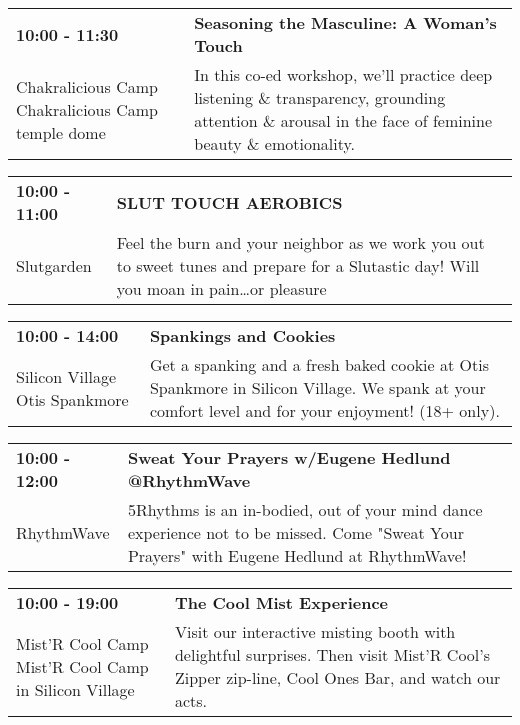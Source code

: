 \begin{tabular}{ p{1in} p{2.2in} }
    \textbf{10:00 - 11:30} & \textbf{Seasoning the Masculine: A Woman's Touch } \\
    Chakralicious Camp \newline Chakralicious Camp temple dome & In this co-ed workshop, we'll practice deep listening \& transparency, grounding attention \& arousal in the face of feminine beauty \& emotionality. \\
    \hline 
\end{tabular}
    
\begin{tabular}{ p{1in} p{2.2in} }
    \textbf{10:00 - 11:00} & \textbf{SLUT TOUCH AEROBICS} \\
    Slutgarden \newline  & Feel the burn and your neighbor as we work you out to sweet tunes and prepare for a Slutastic day! Will you moan in pain\ldots or pleasure \\
    \hline 
\end{tabular}
    
\begin{tabular}{ p{1in} p{2.2in} }
    \textbf{10:00 - 14:00} & \textbf{Spankings and Cookies} \\
    Silicon Village \newline Otis Spankmore & Get a spanking and a fresh baked cookie at Otis Spankmore in Silicon Village. We spank at your comfort level and for your enjoyment! (18+ only). \\
    \hline 
\end{tabular}
    
\begin{tabular}{ p{1in} p{2.2in} }
    \textbf{10:00 - 12:00} & \textbf{Sweat Your Prayers w/Eugene Hedlund @RhythmWave} \\
    RhythmWave \newline  & 5Rhythms is an in-bodied, out of your mind dance experience not to be missed. Come "Sweat Your Prayers" with Eugene Hedlund at RhythmWave! \\
    \hline 
\end{tabular}
    
\begin{tabular}{ p{1in} p{2.2in} }
    \textbf{10:00 - 19:00} & \textbf{The Cool Mist Experience} \\
    Mist'R Cool Camp \newline Mist'R Cool Camp in Silicon Village & Visit our interactive misting booth with delightful surprises. Then visit Mist'R Cool's Zipper zip-line, Cool Ones Bar, and watch our acts. \\
    \hline 
\end{tabular}
    
